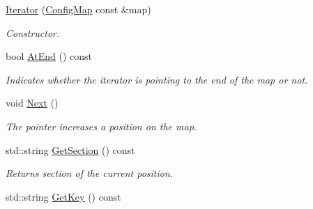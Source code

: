 \begin{DoxyCompactItemize}
\item 
\hypertarget{class_common_1_1_config_map_1_1_iterator_acfa68189c1818ee0f96ab71213fdd2e4}{\hyperlink{class_common_1_1_config_map_1_1_iterator_acfa68189c1818ee0f96ab71213fdd2e4}{Iterator} (\hyperlink{class_common_1_1_config_map}{Config\-Map} const \&map)}\label{class_common_1_1_config_map_1_1_iterator_acfa68189c1818ee0f96ab71213fdd2e4}

\begin{DoxyCompactList}\small\item\em Constructor. \end{DoxyCompactList}\item 
\hypertarget{class_common_1_1_config_map_1_1_iterator_a94b26142475c2eac71a2e2c3fad4f590}{bool \hyperlink{class_common_1_1_config_map_1_1_iterator_a94b26142475c2eac71a2e2c3fad4f590}{At\-End} () const }\label{class_common_1_1_config_map_1_1_iterator_a94b26142475c2eac71a2e2c3fad4f590}

\begin{DoxyCompactList}\small\item\em Indicates whether the iterator is pointing to the end of the map or not. \end{DoxyCompactList}\item 
\hypertarget{class_common_1_1_config_map_1_1_iterator_a69195c2f4220631fe0a772007ed30ca6}{void \hyperlink{class_common_1_1_config_map_1_1_iterator_a69195c2f4220631fe0a772007ed30ca6}{Next} ()}\label{class_common_1_1_config_map_1_1_iterator_a69195c2f4220631fe0a772007ed30ca6}

\begin{DoxyCompactList}\small\item\em The pointer increases a position on the map. \end{DoxyCompactList}\item 
\hypertarget{class_common_1_1_config_map_1_1_iterator_a4cdec86d82eab91cf1c5f8f59f3e2f70}{std\-::string \hyperlink{class_common_1_1_config_map_1_1_iterator_a4cdec86d82eab91cf1c5f8f59f3e2f70}{Get\-Section} () const }\label{class_common_1_1_config_map_1_1_iterator_a4cdec86d82eab91cf1c5f8f59f3e2f70}

\begin{DoxyCompactList}\small\item\em Returns section of the current position. \end{DoxyCompactList}\item 
\hypertarget{class_common_1_1_config_map_1_1_iterator_a67d5501f3b15143986f02864787cf710}{std\-::string \hyperlink{class_common_1_1_config_map_1_1_iterator_a67d5501f3b15143986f02864787cf710}{Get\-Key} () const }\label{class_common_1_1_config_map_1_1_iterator_a67d5501f3b15143986f02864787cf710}


\end{DoxyCompactItemize}
